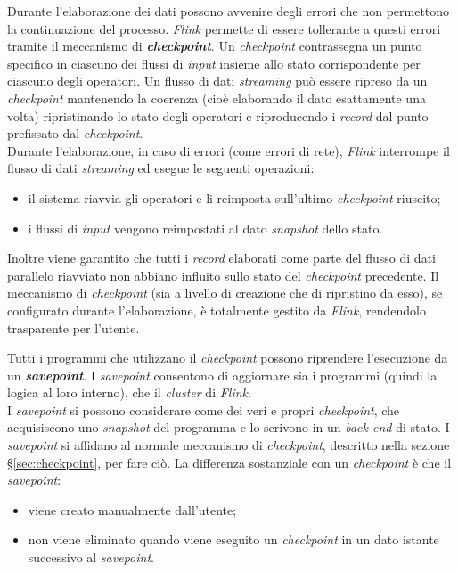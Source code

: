 \label{sec:checkpoint}
\noindent Durante l'elaborazione dei dati possono avvenire degli errori che non permettono la continuazione del processo. \textit{Flink} permette di essere tollerante a questi errori tramite il meccanismo di \textbf{\textit{checkpoint}}. Un \textit{checkpoint} contrassegna un punto specifico in ciascuno dei flussi di \textit{input} insieme allo stato corrispondente per ciascuno degli operatori. Un flusso di dati \textit{streaming} può essere ripreso da un \textit{checkpoint} mantenendo la coerenza (cioè elaborando il dato esattamente una volta) ripristinando lo stato degli operatori e riproducendo i \textit{record} dal punto prefissato dal \textit{checkpoint}.\\
Durante l'elaborazione, in caso di errori (come errori di rete), \textit{Flink} interrompe il flusso di dati \textit{streaming} ed esegue le seguenti operazioni:
\begin{itemize}
	\item{il sistema riavvia gli operatori e li reimposta sull'ultimo \textit{checkpoint} riuscito;}
	\item{i flussi di \textit{input} vengono reimpostati al dato \textit{\gls{snapshot}} dello stato.}
\end{itemize}
Inoltre viene garantito che tutti i \textit{record} elaborati come parte del flusso di dati parallelo riavviato non abbiano influito sullo stato del \textit{checkpoint} precedente.
Il meccanismo di \textit{checkpoint} (sia a livello di creazione che di ripristino da esso), se configurato durante l'elaborazione, è totalmente gestito da \textit{Flink}, rendendolo trasparente per l'utente.

Tutti i programmi che utilizzano il \textit{checkpoint} possono riprendere l'esecuzione da un \textbf{\textit{savepoint}}. I \textit{savepoint} consentono di aggiornare sia i programmi (quindi la logica al loro interno), che il \textit{\gls{cluster}} di \textit{Flink}.\\
I \textit{savepoint} si possono considerare come dei veri e propri \textit{checkpoint}, che acquisiscono uno \textit{\gls{snapshot}} del programma e lo scrivono in un \textit{back-end} di stato. I \textit{savepoint} si affidano al normale meccanismo di \textit{checkpoint}, descritto nella sezione \S\ref{sec:checkpoint}, per fare ciò. La differenza sostanziale con un \textit{checkpoint} è che il \textit{savepoint}:
\begin{itemize}
	\item{viene creato manualmente dall'utente;}
	\item{non viene eliminato quando viene eseguito un \textit{checkpoint} in un dato istante successivo al \textit{savepoint}.}
\end{itemize}


